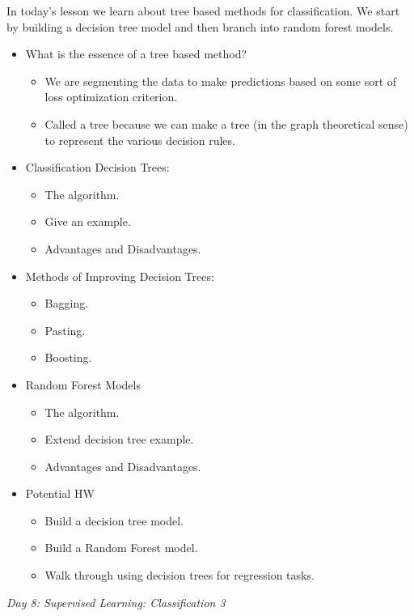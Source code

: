 \documentclass[12pt]{article}
\begin{document}
	\noindent
	In today's lesson we learn about tree based methods for classification. We start by building a decision tree model and then branch into random forest models.
	\begin{itemize}
		\item What is the essence of a tree based method?
			\begin{itemize}
				\item We are segmenting the data to make predictions based on some sort of loss optimization criterion.
				\item Called a tree because we can make a tree (in the graph theoretical sense) to represent the various decision rules.
			\end{itemize}
		\item Classification Decision Trees:
			\begin{itemize}
				\item The algorithm.
				\item Give an example.
				\item Advantages and Disadvantages.
			\end{itemize}
		\item Methods of Improving Decision Trees:
			\begin{itemize}
				\item Bagging.
				\item Pasting.
				\item Boosting.
			\end{itemize}
		\item Random Forest Models
			\begin{itemize}
				\item The algorithm.
				\item Extend decision tree example.
				\item Advantages and Disadvantages.
			\end{itemize}
		\item Potential HW
			\begin{itemize}
				\item Build a decision tree model.
				\item Build a Random Forest model.
				\item Walk through using decision trees for regression tasks.
			\end{itemize}
	\end{itemize}
	
	\vspace{2mm}
	\noindent
	\textit{\large{Day 8: Supervised Learning: Classification 3}}
	
\end{document}
